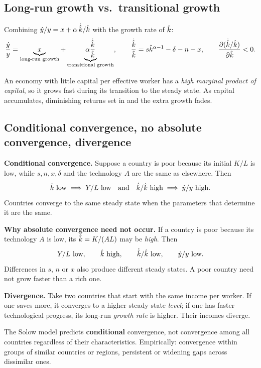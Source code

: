 \documentclass[11pt]{article}
\begin{document}
\subsection{Long-run growth vs.\ transitional growth}
Combining $\dot y/y = x + \alpha\,\dot{\hat{k}}/\hat{k}$ with the growth rate of $\hat{k}$:
\[
\frac{\dot{y}}{y} = \underbrace{x}_{\text{long-run growth}} + \underbrace{\alpha\frac{\dot{\hat{k}}}{\hat{k}}}_{\text{transitional growth}},
\qquad \frac{\dot{\hat{k}}}{\hat{k}} = s\hat{k}^{\alpha-1} - \delta - n - x, \qquad \frac{\partial(\dot{\hat{k}}/\hat{k})}{\partial\hat{k}} < 0.
\]
\begin{intuition}
An economy with little capital per effective worker has a \emph{high marginal product of capital}, so it grows fast during its transition to the steady state. As capital accumulates, diminishing returns set in and the extra growth fades.
\end{intuition}

\subsection{Conditional convergence, no absolute convergence, divergence}
\begin{flatlist}
  \item \textbf{Conditional convergence.} Suppose a country is poor because its initial $K/L$ is low, while $s, n, x, \delta$ and the technology $A$ are the same as elsewhere. Then
  \[ \hat{k} \text{ low} \implies Y/L \text{ low} \quad\text{and}\quad \dot{\hat{k}}/\hat{k} \text{ high} \implies \dot y/y \text{ high}. \]
  Countries converge to the same steady state when the parameters that determine it are the same.

  \item \textbf{Why absolute convergence need not occur.} If a country is poor because its technology $A$ is low, its $\hat{k} = K/(AL)$ may be \emph{high}. Then
  \[ Y/L \text{ low}, \qquad \hat{k} \text{ high}, \qquad \dot{\hat{k}}/\hat{k} \text{ low}, \qquad \dot y/y \text{ low}. \]
  Differences in $s$, $n$ or $x$ also produce different steady states. A poor country need not grow faster than a rich one.

  \item \textbf{Divergence.} Take two countries that start with the same income per worker. If one saves more, it converges to a higher steady-state \emph{level}; if one has faster technological progress, its long-run \emph{growth rate} is higher. Their incomes diverge.
\end{flatlist}

\begin{keyresult}[Prediction]
The Solow model predicts \textbf{conditional} convergence, not convergence among all countries regardless of their characteristics. Empirically: convergence within groups of similar countries or regions, persistent or widening gaps across dissimilar ones.
\end{keyresult}
\end{document}
